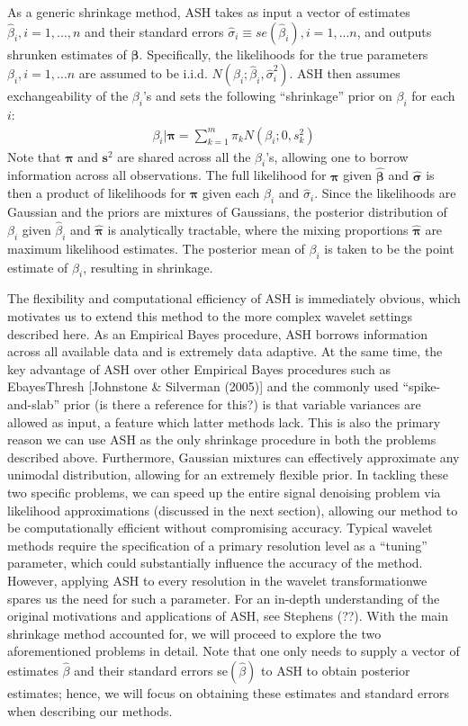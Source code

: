 \documentclass[12pt]{article}
\newcommand{\Gb}{\beta}
\newcommand{\s}{\sigma}
\begin{document}
As a generic shrinkage method, ASH takes as input a vector of estimates $\hat{\Gb}_i,i=1,...,n$ and their standard errors $\hat{\s}_i\equiv se(\hat{\Gb}_i),i=1,...n$, and outputs shrunken estimates of $\bm{\Gb}$. Specifically, the likelihoods for the true parameters $\Gb_i,i=1,...n$ are assumed to be i.i.d. $N(\Gb_i;\hat{\Gb}_i,\hat{\s}_i^2)$. ASH then assumes exchangeability of the $\Gb_i$'s and sets the following ``shrinkage'' prior on $\Gb_i$ for each $i$:
\begin{eqnarray}
\Gb_i|\bm{\pi}=\sum_{k=1}^m \pi_k N(\Gb_i;0,s_k^2)
\end{eqnarray}
Note that $\bm{\pi}$ and $\bm{s}^2$ are shared across all the $\Gb_i$'s, allowing one to borrow information across all observations. The full likelihood for $\bm{\pi}$ given $\bm{\hat{\Gb}}$ and $\bm{\hat{\s}}$ is then a product of likelihoods for $\bm{\pi}$ given each $\hat{\Gb}_i$ and $\hat{\s}_i$. Since the likelihoods are Gaussian and the priors are mixtures of Gaussians, the posterior distribution of $\Gb_i$ given $\hat{\Gb}_i$ and $\bm{\hat{\pi}}$ is analytically tractable, where the mixing proportions $\bm{\hat{\pi}}$ are maximum likelihood estimates. The posterior mean of $\Gb_i$ is taken to be the point estimate of $\Gb_i$, resulting in shrinkage.

The flexibility and computational efficiency of ASH is immediately obvious, which motivates us to extend this method to the more complex wavelet settings described here. As an Empirical Bayes procedure, ASH borrows information across all available data and is extremely data adaptive. At the same time, the key advantage of ASH over other Empirical Bayes procedures such as EbayesThresh [Johnstone \& Silverman (2005)] and the commonly used ``spike-and-slab'' prior (is there a reference for this?) is that variable variances are allowed as input, a feature which latter methods lack. This is also the primary reason we can use ASH as the only shrinkage procedure in both the problems described above. Furthermore, Gaussian mixtures can effectively approximate any unimodal distribution, allowing for an extremely flexible prior. In tackling these two specific problems, we can speed up the entire signal denoising problem via likelihood approximations (discussed in the next section), allowing our method to be computationally efficient without compromising accuracy. Typical wavelet methods require the specification of a primary resolution level as a ``tuning'' parameter, which could substantially influence the accuracy of the method. However, applying ASH to every resolution in the wavelet transformationwe spares us the need for such a parameter. For an in-depth understanding of the original motivations and applications of ASH, see Stephens (??). With the main shrinkage method accounted for, we will proceed to explore the two aforementioned problems in detail. Note that one only needs to supply a vector of estimates $\hat{\Gb}$ and their standard errors se$(\hat{\Gb})$ to ASH to obtain posterior estimates; hence, we will focus on obtaining these estimates and standard errors when describing our methods.
\end{document}
